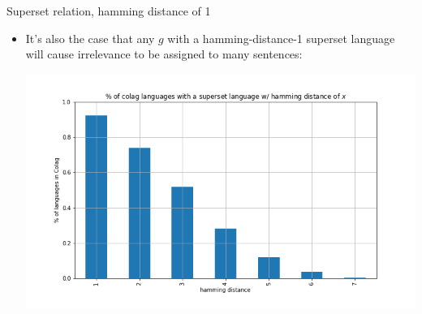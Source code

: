 \documentclass[presentation]{beamer}
\begin{document}
\begin{frame}[label={sec:org87caaf5}]{Superset relation, hamming distance of 1}
\begin{itemize}
\item It's also the case that any \(g\) with a hamming-distance-1 superset language
will cause irrelevance to be assigned to many sentences:

\begin{center}
\includegraphics[width=.9\linewidth]{./images/superset-ham-dist.png}
\end{center}
\end{itemize}
\end{frame}
\end{document}
